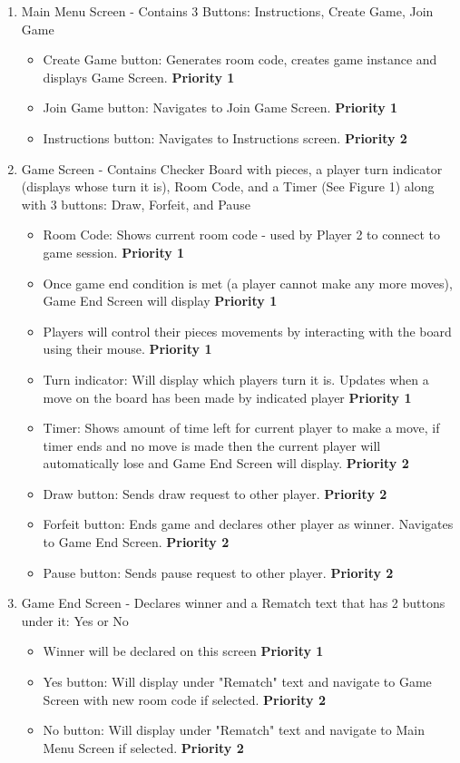 \documentclass[10pt]{article}
\begin{document}
\begin{enumerate}
\item Main Menu Screen - Contains 3 Buttons: Instructions, Create Game, Join Game
\begin{itemize}
    \item Create Game button: Generates room code, creates game instance and displays Game Screen. \textbf{Priority 1}
    \item Join Game button: Navigates to Join Game Screen. \textbf{Priority 1}
    \item Instructions button: Navigates to Instructions screen. \textbf{Priority 2}
\end{itemize}

\item Game Screen - Contains Checker Board with pieces, a player turn indicator (displays whose turn it is), Room Code, and a Timer (See Figure 1) along with 3 buttons: Draw, Forfeit, and Pause 
\begin{itemize}
    \item Room Code: Shows current room code - used by Player 2 to connect to game session. \textbf{Priority 1}
    \item Once game end condition is met (a player cannot make any more moves), Game End Screen will display \textbf{Priority 1}
    \item Players will control their pieces movements by interacting with the board using their mouse. \textbf{Priority 1}
    \item Turn indicator: Will display which players turn it is. Updates when a move on the board has been made by indicated player \textbf{Priority 1}
    \item Timer: Shows amount of time left for current player to make a move, if timer ends and no move is made then the current player will automatically lose and Game End Screen will display. \textbf{Priority 2}
    \item Draw button: Sends draw request to other player. \textbf{Priority 2}
    \item Forfeit button: Ends game and declares other player as winner. Navigates to Game End Screen. \textbf{Priority 2}
    \item Pause button: Sends pause request to other player. \textbf{Priority 2}
\end{itemize}

\item Game End Screen - Declares winner and a Rematch text that has 2 buttons under it: Yes or No
\begin{itemize}
    \item Winner will be declared on this screen \textbf{Priority 1}
    \item Yes button: Will display under "Rematch" text and navigate to Game Screen with new room code if selected. \textbf{Priority 2}
    \item No button: Will display under "Rematch" text and navigate to Main Menu Screen if selected. \textbf{Priority 2}
\end{itemize}


\end{enumerate}
\end{document}
